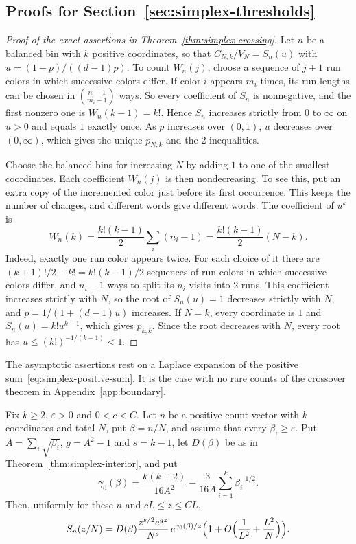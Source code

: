 \subsection{Proofs for Section~\ref{sec:simplex-thresholds}}

\begin{proof}[Proof of the exact assertions in Theorem~\ref{thm:simplex-crossing}]
Let $n$ be a balanced bin with $k$ positive coordinates, so that
$C_{N,k}/V_N=S_n(u)$ with $u=(1-p)/((d-1)p)$. To count $W_n(j)$, choose a
sequence of $j+1$ run colors in which successive colors differ. If color $i$
appears $m_i$ times, its run lengths can be chosen in $\binom{n_i-1}{m_i-1}$
ways. So every coefficient of $S_n$ is nonnegative, and the first nonzero one is
$W_n(k-1)=k!$. Hence $S_n$ increases strictly from $0$ to $\infty$ on $u>0$ and
equals $1$ exactly once. As $p$ increases over $(0,1)$, $u$ decreases over
$(0,\infty)$, which gives the unique $p_{N,k}$ and the 2 inequalities.

Choose the balanced bins for increasing $N$ by adding $1$ to one of the smallest
coordinates. Each coefficient $W_n(j)$ is then nondecreasing. To see this, put an
extra copy of the incremented color just before its first occurrence. This keeps
the number of changes, and different words give different words. The coefficient
of $u^k$ is
\[
W_n(k)=\frac{k!(k-1)}2\sum_i(n_i-1)=\frac{k!(k-1)}2(N-k).
\]
Indeed, exactly one run color appears twice. For each choice of it there are
$(k+1)!/2-k!=k!(k-1)/2$ sequences of run colors in which successive colors
differ, and $n_i-1$ ways to split its $n_i$ visits into 2 runs. This coefficient
increases strictly with $N$, so the root of $S_n(u)=1$ decreases strictly with
$N$, and $p=1/(1+(d-1)u)$ increases. If $N=k$, every coordinate is $1$ and
$S_n(u)=k!u^{k-1}$, which gives $p_{k,k}$. Since the root decreases with $N$,
every root has $u\le(k!)^{-1/(k-1)}<1$.
\end{proof}

The asymptotic assertions rest on a Laplace expansion of the positive
sum~\eqref{eq:simplex-positive-sum}. It is the case with no rare counts of the
crossover theorem in Appendix~\ref{app:boundary}.

\begin{lemma}\label{lem:no-rare}
Fix $k\ge2$, $\varepsilon>0$ and $0<c<C$. Let $n$ be a positive count vector
with $k$ coordinates and total $N$, put $\beta=n/N$, and assume that every
$\beta_i\ge\varepsilon$. Put $A=\sum_i\sqrt{\beta_i}$, $g=A^2-1$ and $s=k-1$,
let $D(\beta)$ be as in Theorem~\ref{thm:simplex-interior}, and put
\[
\gamma_0(\beta)=\frac{k(k+2)}{16A^2}-\frac3{16A}\sum_{i=1}^k\beta_i^{-1/2}.
\]
Then, uniformly for these $n$ and $cL\le z\le CL$,
\begin{equation}\label{eq:no-rare}
S_n(z/N)=D(\beta)\frac{z^{s/2}e^{gz}}{N^s}\,e^{\gamma_0(\beta)/z}
\Bigl(1+O\Bigl(\frac1{L^2}+\frac{L^2}N\Bigr)\Bigr).
\end{equation}
\end{lemma}

